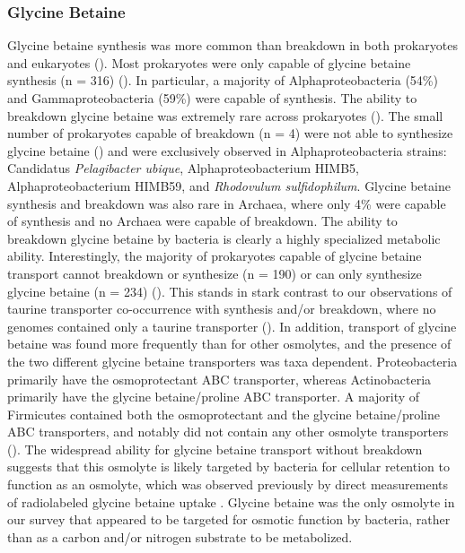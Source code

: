 \documentclass[utf8]{frontiersSCNS} %
\begin{document}
\subsubsection*{Glycine Betaine}
Glycine betaine synthesis was more common than breakdown in both prokaryotes and eukaryotes (). Most prokaryotes were only capable of glycine betaine synthesis (n = 316) (). In particular, a majority of Alphaproteobacteria (54\%) and Gammaproteobacteria (59\%) were capable of synthesis. The ability to breakdown glycine betaine was extremely rare across prokaryotes (). The small number of prokaryotes capable of breakdown (n = 4) were not able to synthesize glycine betaine () and were exclusively observed in Alphaproteobacteria strains: Candidatus \emph{Pelagibacter ubique}, Alphaproteobacterium HIMB5, Alphaproteobacterium HIMB59, and \emph{Rhodovulum sulfidophilum}. Glycine betaine synthesis and breakdown was also rare in Archaea, where only 4\% were capable of synthesis and no Archaea were capable of breakdown. The ability to breakdown glycine betaine by bacteria is clearly a highly specialized metabolic ability. Interestingly, the majority of prokaryotes capable of glycine betaine transport cannot breakdown or synthesize (n = 190) or can only synthesize glycine betaine (n = 234)  (). This stands in stark contrast to our observations of taurine transporter co-occurrence with synthesis and/or breakdown, where no genomes contained only a taurine transporter (). In addition, transport of glycine betaine was found more frequently than for other osmolytes, and the presence of the two different glycine betaine transporters was taxa dependent. Proteobacteria primarily have the osmoprotectant ABC transporter, whereas Actinobacteria primarily have the glycine betaine/proline ABC transporter. A majority of Firmicutes contained both the osmoprotectant and the glycine betaine/proline ABC transporters, and notably did not contain any other osmolyte transporters (). The widespread ability for glycine betaine transport without breakdown suggests that this osmolyte is likely targeted by bacteria for cellular retention to function as an osmolyte, which was observed previously by direct measurements of radiolabeled glycine betaine uptake \citep{Kiene1998}. Glycine betaine was the only osmolyte in our survey that appeared to be targeted for osmotic function by bacteria, rather than as a carbon and/or nitrogen substrate to be metabolized. 
\end{document}
